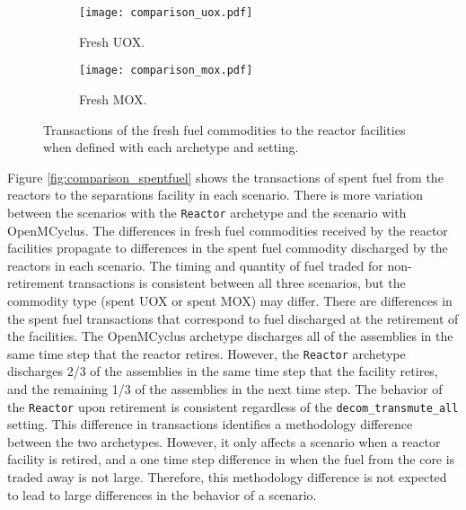 \begin{figure}[ht!]
    \centering
    \begin{subfigure}[b]{0.48\textwidth}
        \centering
        \texttt{[image: comparison\_uox.pdf]}
        \caption{Fresh UOX.}
        \label{fig:comparison_uox}
    \end{subfigure}
    \hfill
    \begin{subfigure}[b]{0.48\textwidth}
        \centering
        \texttt{[image: comparison\_mox.pdf]}
        \caption{Fresh MOX.}
        \label{fig:comparison_mox}
    \end{subfigure}
       \caption{Transactions of the fresh fuel commodities to the 
       reactor facilities when defined with each archetype and 
       setting.}
       \label{fig:comparison_fuel}
\end{figure}

Figure \ref{fig:comparison_spentfuel} shows the transactions of 
spent fuel from the reactors to the separations facility in each 
scenario. There is more variation between the scenarios with the 
\Cycamore \texttt{Reactor} archetype and the scenario with OpenMCyclus. 
The differences in fresh fuel commodities received by the 
reactor facilities propagate to differences in the spent fuel commodity 
discharged by the reactors in each scenario. The timing and quantity of 
fuel traded for non-retirement transactions is consistent between all 
three scenarios, but the commodity type (spent UOX or spent MOX) may 
differ. There are differences in the spent fuel 
transactions that correspond to fuel discharged at the retirement of the 
facilities. The OpenMCyclus archetype discharges all of the assemblies 
in the same time step that the reactor retires. However, the \Cycamore 
\texttt{Reactor} archetype discharges 2/3 of the assemblies in the same 
time step that the facility retires, and the remaining 1/3 of the assemblies 
in the next time step. The behavior of the \Cycamore \texttt{Reactor} 
upon retirement is consistent regardless of the \texttt{decom\_transmute\_all}
setting. This difference in transactions identifies a methodology 
difference between the two archetypes. However, it only affects a 
scenario when a reactor facility is retired, and a one time step difference 
in when the fuel from the core is traded away is not large. Therefore, 
this methodology difference is not expected to lead to large differences 
in the behavior of a scenario. 

